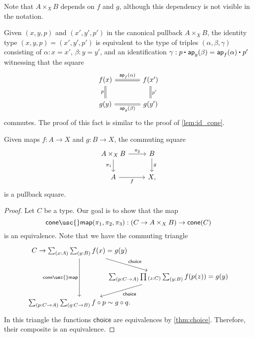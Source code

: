 Note that $A\times_X B$ depends on $f$ and $g$, although this dependency is not visible in the notation.

\begin{rmk}
  Given $(x,y,p)$ and $(x',y',p')$ in the canonical pullback $A\times_X B$, the identity type $(x,y,p)=(x',y',p')$ is equivalent to the type of triples $(\alpha,\beta,\gamma)$ consisting of $\alpha:x=x'$, $\beta:y=y'$, and an identification $\gamma:\ct{p}{\ap{g}{\beta}}=\ct{\ap{f}{\alpha}}{p'}$ witnessing that the square
  \begin{equation*}
    \begin{tikzcd}[column sep=large]
      f(x) \arrow[r,equal,"\ap{f}{\alpha}"] \arrow[d,swap,equal,"p"] & f(x') \arrow[d,equal,"{p'}"] \\
      g(y) \arrow[r,swap,equal,"\ap{g}{\beta}"] & g(y')
    \end{tikzcd}
  \end{equation*}
  commutes. The proof of this fact is similar to the proof of \cref{lem:id_cone}.
\end{rmk}

\begin{thm}\label{thm:canonical-pullback}
Given maps $f:A\to X$ and $g:B\to X$, the commuting square
\begin{equation*}
\begin{tikzcd}
A\times_X B \arrow[r,"\pi_2"] \arrow[d,swap,"\pi_1"] & B \arrow[d,"g"] \\
A \arrow[r,swap,"f"] & X,
\end{tikzcd}
\end{equation*}
is a pullback square.
\end{thm}

\begin{proof}
Let $C$ be a type. Our goal is to show that the map
\begin{equation*}
\mathsf{cone\usc{}map}(\pi_1,\pi_2,\pi_3): (C\to A\times_X B)\to \mathsf{cone}(C)
\end{equation*}
is an equivalence. Note that we have the commuting triangle
\begin{equation*}
  \begin{tikzcd}[column sep=-4em]
    C\to\sm{x:A}{y:B}f(x)=g(y) \arrow[dd,swap,"\mathsf{cone\usc{}map}"] \arrow[dr,"\mathsf{choice}"] \\
    & \sm{p:C\to A}\prd{z:C}\sm{y:B} f(p(z))= g(y) \arrow[dl,"\mathsf{choice}"] \\
    \sm{p:C\to A}{q:C\to B} f\circ p \htpy g\circ q.
  \end{tikzcd}
\end{equation*}
In this triangle the functions $\mathsf{choice}$ are equivalences by \cref{thm:choice}. Therefore, their composite is an equivalence.
\end{proof}

